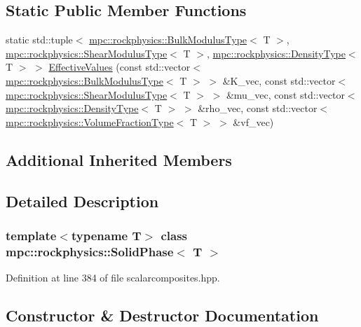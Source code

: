 \subsection*{Static Public Member Functions}
\begin{DoxyCompactItemize}
\item 
static std\+::tuple$<$ \mbox{\hyperlink{structmpc_1_1rockphysics_1_1_bulk_modulus_type}{mpc\+::rockphysics\+::\+Bulk\+Modulus\+Type}}$<$ T $>$, \mbox{\hyperlink{structmpc_1_1rockphysics_1_1_shear_modulus_type}{mpc\+::rockphysics\+::\+Shear\+Modulus\+Type}}$<$ T $>$, \mbox{\hyperlink{structmpc_1_1rockphysics_1_1_density_type}{mpc\+::rockphysics\+::\+Density\+Type}}$<$ T $>$ $>$ \mbox{\hyperlink{classmpc_1_1rockphysics_1_1_solid_phase_ae8dbd8e5777a51515f84f6fb7e87ba97}{Effective\+Values}} (const std\+::vector$<$ \mbox{\hyperlink{structmpc_1_1rockphysics_1_1_bulk_modulus_type}{mpc\+::rockphysics\+::\+Bulk\+Modulus\+Type}}$<$ T $>$ $>$ \&K\+\_\+vec, const std\+::vector$<$ \mbox{\hyperlink{structmpc_1_1rockphysics_1_1_shear_modulus_type}{mpc\+::rockphysics\+::\+Shear\+Modulus\+Type}}$<$ T $>$ $>$ \&mu\+\_\+vec, const std\+::vector$<$ \mbox{\hyperlink{structmpc_1_1rockphysics_1_1_density_type}{mpc\+::rockphysics\+::\+Density\+Type}}$<$ T $>$ $>$ \&rho\+\_\+vec, const std\+::vector$<$ \mbox{\hyperlink{structmpc_1_1rockphysics_1_1_volume_fraction_type}{mpc\+::rockphysics\+::\+Volume\+Fraction\+Type}}$<$ T $>$ $>$ \&vf\+\_\+vec)
\end{DoxyCompactItemize}
\subsection*{Additional Inherited Members}


\subsection{Detailed Description}
\subsubsection*{template$<$typename T$>$\newline
class mpc\+::rockphysics\+::\+Solid\+Phase$<$ T $>$}



Definition at line 384 of file scalarcomposites.\+hpp.



\subsection{Constructor \& Destructor Documentation}
\mbox{\label{classmpc_1_1rockphysics_1_1_solid_phase_ad44503640c956a6c89cb71678dacd6b1}} 
